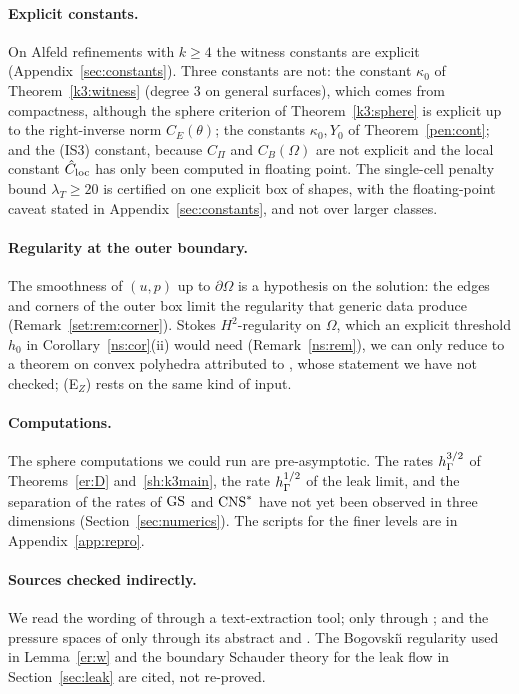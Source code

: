 \paragraph{Explicit constants.} On Alfeld refinements with $k\ge4$ the witness constants are explicit (Appendix~\ref{sec:constants}). Three constants are not: the constant $\kappa_0$ of Theorem~\ref{k3:witness} (degree $3$ on general surfaces), which comes from compactness, although the sphere criterion of Theorem~\ref{k3:sphere} is explicit up to the right-inverse norm $C_E(\theta)$; the constants $\kappa_0,Y_0$ of Theorem~\ref{pen:cont}; and the (IS3) constant, because $C_\Pi$ and $C_B(\Omega)$ are not explicit and the local constant $\hat C_{\rm loc}$ has only been computed in floating point. The single-cell penalty bound $\lambda_T\ge20$ is certified on one explicit box of shapes, with the floating-point caveat stated in Appendix~\ref{sec:constants}, and not over larger classes.

\paragraph{Regularity at the outer boundary.} The smoothness of $(u,p)$ up to $\partial\Omega$ is a hypothesis on the solution: the edges and corners of the outer box limit the regularity that generic data produce (Remark~\ref{set:rem:corner}). Stokes $H^2$-regularity on $\Omega$, which an explicit threshold $h_0$ in Corollary~\ref{ns:cor}(ii) would need (Remark~\ref{ns:rem}), we can only reduce to a theorem on convex polyhedra attributed to \cite{Dauge1989}, whose statement we have not checked; (E$_Z$) rests on the same kind of input.

\paragraph{Computations.} The sphere computations we could run are pre-asymptotic. The rates $h_\Gamma^{3/2}$ of Theorems~\ref{er:D} and~\ref{sh:k3main}, the rate $h_\Gamma^{1/2}$ of the leak limit, and the separation of the rates of $\mathrm{GS}$ and $\mathrm{CNS}^\ast$ have not yet been observed in three dimensions (Section~\ref{sec:numerics}). The scripts for the finer levels are in Appendix~\ref{app:repro}.

\paragraph{Sources checked indirectly.} We read the wording of \cite[Theorem~3.1]{GuzmanNeilan2018} through a text-extraction tool; \cite[Proposition~6.5]{Neilan2015} only through \cite{FarrellMitchellScott2024}; and the pressure spaces of \cite{GuzmanLischkeNeilan2022} only through its abstract and \cite{FabienGuzmanNeilanZytoon2022}. The Bogovski\u{\i} regularity used in Lemma~\ref{er:w} and the boundary Schauder theory for the leak flow in Section~\ref{sec:leak} are cited, not re-proved.
